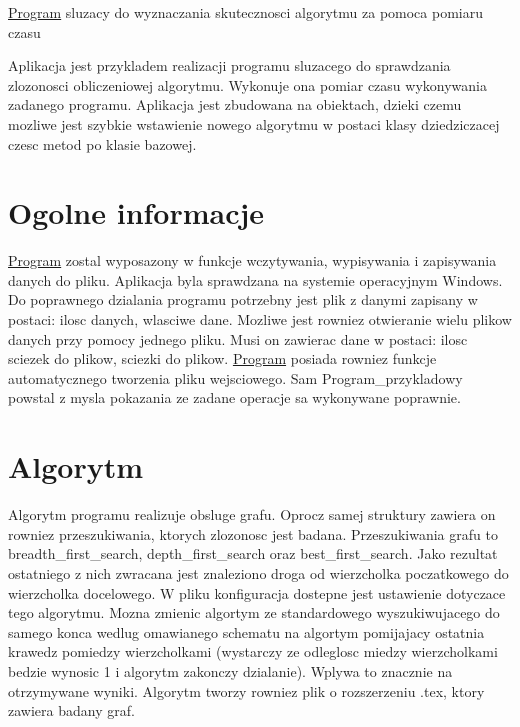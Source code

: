 \hyperlink{class_program}{Program} sluzacy do wyznaczania skutecznosci algorytmu za pomoca pomiaru czasu

Aplikacja jest przykladem realizacji programu sluzacego do sprawdzania zlozonosci obliczeniowej algorytmu. Wykonuje ona pomiar czasu wykonywania zadanego programu. Aplikacja jest zbudowana na obiektach, dzieki czemu mozliwe jest szybkie wstawienie nowego algorytmu w postaci klasy dziedziczacej czesc metod po klasie bazowej.\hypertarget{index_etykieta-ogolne-informacje}{}\section{Ogolne informacje}\label{index_etykieta-ogolne-informacje}
\hyperlink{class_program}{Program} zostal wyposazony w funkcje wczytywania, wypisywania i zapisywania danych do pliku. Aplikacja byla sprawdzana na systemie operacyjnym Windows. Do poprawnego dzialania programu potrzebny jest plik z danymi zapisany w postaci\+: ilosc danych, wlasciwe dane. Mozliwe jest rowniez otwieranie wielu plikow danych przy pomocy jednego pliku. Musi on zawierac dane w postaci\+: ilosc sciezek do plikow, sciezki do plikow. \hyperlink{class_program}{Program} posiada rowniez funkcje automatycznego tworzenia pliku wejsciowego. Sam Program\+\_\+przykladowy powstal z mysla pokazania ze zadane operacje sa wykonywane poprawnie.\hypertarget{index_etykieta-algortym}{}\section{Algorytm}\label{index_etykieta-algortym}
Algorytm programu realizuje obsluge grafu. Oprocz samej struktury zawiera on rowniez przeszukiwania, ktorych zlozonosc jest badana. Przeszukiwania grafu to breadth\+\_\+first\+\_\+search, depth\+\_\+first\+\_\+search oraz best\+\_\+first\+\_\+search. Jako rezultat ostatniego z nich zwracana jest znaleziono droga od wierzcholka poczatkowego do wierzcholka docelowego. W pliku konfiguracja dostepne jest ustawienie dotyczace tego algorytmu. Mozna zmienic algortym ze standardowego wyszukiwujacego do samego konca wedlug omawianego schematu na algortym pomijajacy ostatnia krawedz pomiedzy wierzcholkami (wystarczy ze odleglosc miedzy wierzcholkami bedzie wynosic 1 i algorytm zakonczy dzialanie). Wplywa to znacznie na otrzymywane wyniki. Algorytm tworzy rowniez plik o rozszerzeniu .tex, ktory zawiera badany graf. 